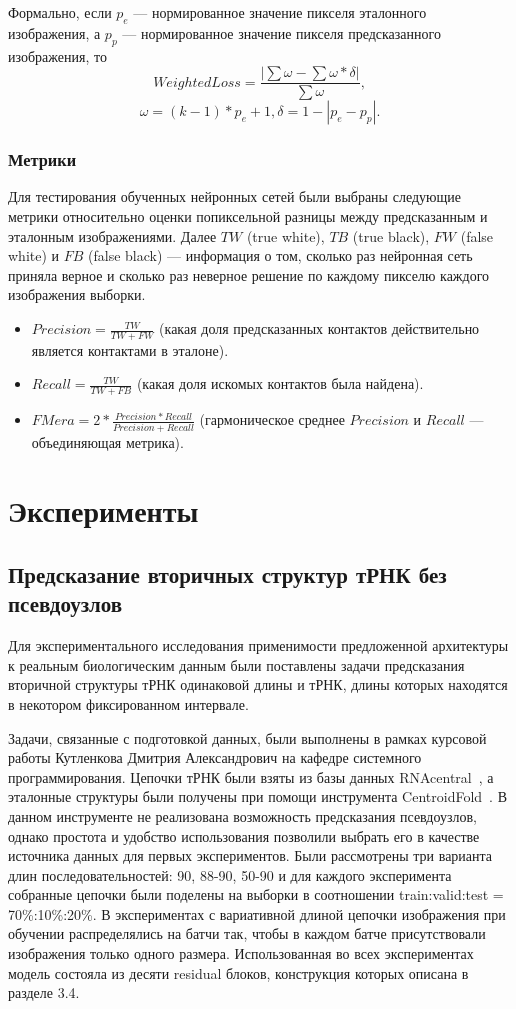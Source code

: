\documentclass[14pt]{matmex-diploma-custom}
\begin{document}
Формально, если $p_{e}$ --- нормированное значение пикселя эталонного изображения, а $p_{p}$ --- нормированное значение пикселя предсказанного изображения, то 
\[WeightedLoss = \frac{|\sum \omega - \sum \omega \ast \delta |}{\sum \omega},\] 
\[\omega = (k - 1) \ast p_{e} + 1, \delta = 1 - |p_{e} - p_{p}|.\]

\subsubsection{Метрики}
Для тестирования обученных нейронных сетей были выбраны следующие метрики относительно оценки попиксельной разницы между предсказанным и эталонным изображениями. Далее $TW$ (true white), $TB$ (true black), $FW$ (false white) и $FB$ (false black) --- информация о том, сколько раз нейронная сеть приняла верное и сколько раз неверное решение по каждому пикселю каждого изображения выборки.
\begin{itemize}
    \item $Precision = \frac{TW}{TW + FW}$ (какая доля предсказанных контактов действительно является контактами в эталоне).
    \item $Recall = \frac{TW}{TW + FB}$ (какая доля искомых контактов была найдена).
    \item $FMera = 2 * \frac{Precision * Recall}{Precision + Recall}$ (гармоническое среднее $Precision$ и $Recall$ --- объединяющая метрика).
\end{itemize}

\section{Эксперименты}
\subsection{Предсказание вторичных структур тРНК без псевдоузлов}
Для экспериментального исследования применимости предложенной архитектуры к реальным биологическим данным были поставлены задачи предсказания вторичной структуры тРНК одинаковой длины и тРНК, длины которых находятся в некотором фиксированном интервале. 

Задачи, связанные с подготовкой данных, были выполнены в рамках курсовой работы Кутленкова Дмитрия Александрович на кафедре системного программирования. Цепочки тРНК были взяты из базы данных RNAcentral~\cite{rnacentral}, а эталонные структуры были получены при помощи инструмента CentroidFold~\cite{sato2009centroidfold}. В данном инструменте не реализована возможность предсказания псевдоузлов, однако простота и удобство использования позволили выбрать его в качестве источника данных для первых экспериментов. Были рассмотрены три варианта длин последовательностей: 90, 88-90, 50-90 и для каждого эксперимента собранные цепочки были поделены на выборки в соотношении train:valid:test = 70\%:10\%:20\%. В экспериментах с вариативной длиной цепочки изображения при обучении распределялись на батчи так, чтобы в каждом батче присутствовали изображения только одного размера. Использованная во всех экспериментах модель состояла из десяти residual блоков, конструкция которых описана в разделе 3.4.
\end{document}
